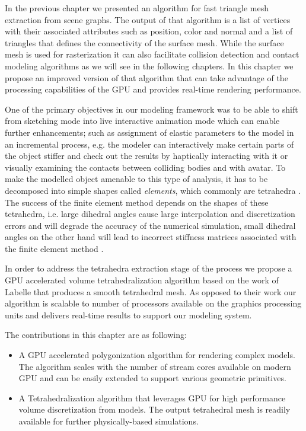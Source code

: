 \label{chapter:GPUDiscretization}
In the previous chapter we presented an algorithm for fast triangle mesh extraction from \blob scene graphs. The output of that 
algorithm is a list of vertices with their associated attributes such as position, color and normal and a list of triangles that
defines the connectivity of the surface mesh. While the surface mesh is used for rasterization it can also facilitate  
collision detection and contact modeling algorithms as we will see in the following chapters.  In this chapter we propose an improved 
version of that algorithm that can take advantage of the processing capabilities of the GPU and provides real-time \blob rendering performance. 



One of the primary objectives in our modeling framework was to be able to shift from sketching mode into live interactive animation mode
which can enable further enhancements; such as assignment of elastic parameters to the model in an incremental process, e.g. the
modeler can interactively make certain parts of the object stiffer and check out the results by haptically interacting with it or
visually examining the contacts between colliding bodies and with avatar. To make the modelled object amenable to this type of analysis, it has 
to be decomposed into simple shapes called \textit{elements}, which commonly are tetrahedra \cite{Labelle2007}. 
The success of the finite element method depends on the shapes of these tetrahedra, i.e. large dihedral angles cause large interpolation 
and discretization errors and will degrade the accuracy of the numerical simulation, small dihedral angles on the other hand will 
lead to incorrect stiffness matrices associated with the finite element method \cite{Shewchuk}. 


In order to address the tetrahedra extraction stage of the process we propose a GPU accelerated volume tetrahedralization algorithm based on the work of
Labelle \etal \cite{Labelle2007} that produces a smooth tetrahedral mesh. As opposed to their work our algorithm is scalable to number of processors 
available on the graphics processing units and delivers real-time results to support our modeling system.

The contributions in this chapter are as following:

\begin{itemize}
 \item A GPU accelerated polygonization algorithm for rendering complex \blob models. The algorithm scales with the number of stream cores available
 on modern GPU and can be easily extended to support various geometric primitives.
 
 \item A Tetrahedralization algorithm that leverages GPU for high performance volume discretization from \blob models. The output tetrahedral mesh is
 readily available for further physically-based simulations.
\end{itemize}


